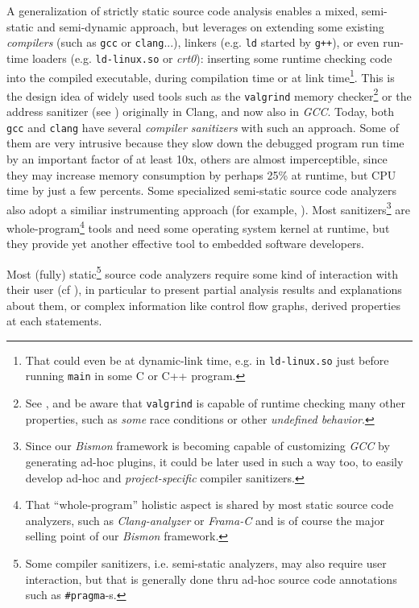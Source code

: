 A generalization of strictly static source code analysis enables a
mixed, semi-static and semi-dynamic approach, but leverages on
extending some existing \emph{compilers} (such as \texttt{gcc} or
\texttt{clang}...), linkers (e.g. \texttt{ld} started by
\texttt{g++}), or even run-time loaders (e.g. \texttt{ld-linux.so} or
\emph{crt0}): inserting some runtime checking code into the compiled
executable, during compilation time or at link time\footnote{That
  could even be at dynamic-link time, e.g. in \texttt{ld-linux.so}
  just before running \texttt{main} in some C or C++ program.}. This
is the design idea of widely used tools such as the \texttt{valgrind}
memory checker\footnote{See , and be aware
  that \texttt{valgrind} is capable of runtime checking many other
  properties, such as \emph{some} race conditions or other \emph{undefined behavior}.} or the address sanitizer (see
\cite{Serebryany:2012:Asan}) originally in {Clang}, and now also in
\emph{GCC}. Today, both \texttt{gcc} and \texttt{clang} have several
  \emph{compiler
  sanitizers} with such an approach. Some of them are very intrusive
because they slow down the debugged program run time by an important
factor of at least 10x, others are almost imperceptible, since they
may increase memory consumption by perhaps 25\% at runtime, but CPU
time by just a few percents. Some specialized semi-static source code
analyzers also adopt a similiar instrumenting approach (for example,
\cite{Biswas:2017:VVV}). Most sanitizers\footnote{Since our
  \emph{Bismon} framework is becoming capable of customizing
  \emph{GCC} by generating ad-hoc plugins, it could be later used in
  such a way too, to easily develop ad-hoc and \emph{project-specific}
  compiler sanitizers.} are whole-program\footnote{That
  ``whole-program'' holistic aspect is shared by most static source
  code analyzers, such as \emph{Clang-analyzer} or \emph{Frama-C} and
  is of course the major selling point of our \emph{Bismon}
  framework.} tools and need some operating system kernel at runtime,
but they provide yet another effective tool to embedded software
developers.

\medskip

Most (fully) static\footnote{Some compiler sanitizers,
  i.e. semi-static analyzers, may also require user interaction, but
  that is generally done thru ad-hoc source code annotations such as
  \texttt{\#pragma}-s.} source code analyzers require some kind of
interaction with their user (cf \cite{Lipford:2014:ICA}), in
particular to present partial analysis results and explanations about
them, or complex information like control flow graphs, derived
properties at each statements.

